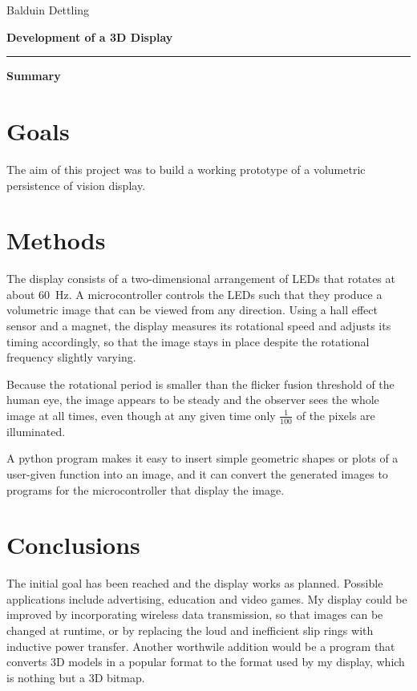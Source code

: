 \documentclass[a4paper, 11pt]{article}
\begin{document}
\hfill Balduin Dettling

\vspace{1cm}
\begin{center}

    {\huge\bfseries Development of a 3D Display\vspace{-2mm}} 
    \rule{0.67\textwidth}{1.5pt}

    {\vspace{-2mm} \Large\bfseries Summary}

\end{center}

\section*{Goals}

The aim of this project was to build a working prototype of a volumetric persistence of vision
display.

\section*{Methods}

The display consists of a two-dimensional arrangement of LEDs that rotates at about
\SI{60}{\hertz}. A microcontroller controls the LEDs such that they produce a volumetric image
that can be viewed from any direction. Using a hall effect sensor and a magnet, the display
measures its rotational speed and adjusts its timing accordingly, so that the image stays in place
despite the rotational frequency slightly varying. 

Because the rotational period is smaller than the flicker fusion threshold of the human eye, the
image appears to be steady and the observer sees the whole image at all times, even though at any
given time only $\frac{1}{100}$ of the pixels are illuminated.

A python program makes it easy to insert simple geometric shapes or plots of a user-given function
into an image, and it can convert the generated images to programs for the microcontroller that
display the image.

\section*{Conclusions}

The initial goal has been reached and the display works as planned. Possible applications include
advertising, education and video games. My display could be improved by incorporating wireless
data transmission, so that images can be changed at runtime, or by replacing the loud and
inefficient slip rings with inductive power transfer. Another worthwile addition would be a
program that converts 3D models in a popular format to the format used by my display, which is
nothing but a 3D bitmap.
\end{document}
